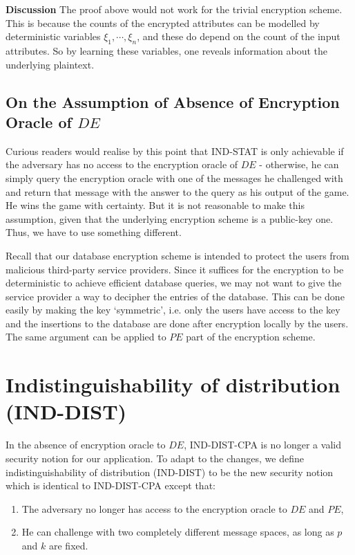 \textbf{Discussion} The proof above would not work for the trivial encryption scheme. This is because the counts of the encrypted attributes can be modelled by deterministic variables $\xi_1, \cdots, \xi_n$, and these do depend on the count of the input attributes. So by learning these variables, one reveals information about the underlying plaintext.




\subsection{On the Assumption of Absence of Encryption Oracle of $DE$}
Curious readers would realise by this point that IND-STAT is only achievable if the adversary has no access to the encryption oracle of $DE$ - otherwise, he can simply query the encryption oracle with one of the messages he challenged with and return that message with the answer to the query as his output of the game. He wins the game with certainty. But it is not reasonable to make this assumption, given that the underlying encryption scheme is a public-key one. Thus, we have to use something different.

Recall that our database encryption scheme is intended to protect the users from malicious third-party service providers. Since it suffices for the encryption to be deterministic to achieve efficient database queries, we may not want to give the service provider a way to decipher the entries of the database. This can be done easily by making the key `symmetric', i.e. only the users have access to the key and the insertions to the database are done after encryption locally by the users. The same argument can be applied to $PE$ part of the encryption scheme.




\section{Indistinguishability of distribution (IND-DIST)}
In the absence of encryption oracle to $DE$, IND-DIST-CPA is no longer a valid security notion for our application. To adapt to the changes, we define indistinguishability of distribution (IND-DIST) to be the new security notion which is identical to IND-DIST-CPA except that:
\begin{enumerate}
\item The adversary no longer has access to the encryption oracle to $DE$ and $PE$,
\item He can challenge with two completely different message spaces, as long as $p$ and $k$ are fixed.
\end{enumerate}

